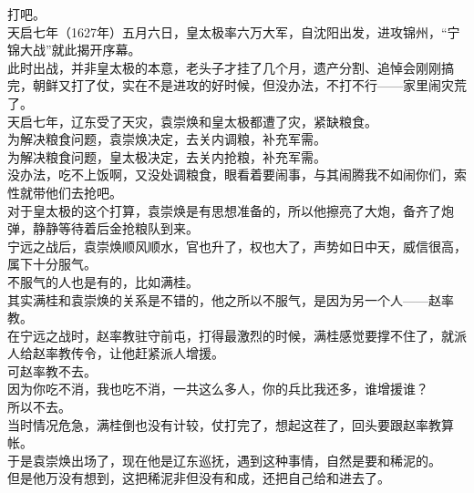 \begin{multicols}{\theparacolNo}
打吧。\\

天启七年（1627年）五月六日，皇太极率六万大军，自沈阳出发，进攻锦州，“宁锦大战”就此揭开序幕。\\

此时出战，并非皇太极的本意，老头子才挂了几个月，遗产分割、追悼会刚刚搞完，朝鲜又打了仗，实在不是进攻的好时候，但没办法，不打不行——家里闹灾荒了。\\

天启七年，辽东受了天灾，袁崇焕和皇太极都遭了灾，紧缺粮食。\\

为解决粮食问题，袁崇焕决定，去关内调粮，补充军需。\\

为解决粮食问题，皇太极决定，去关内抢粮，补充军需。\\

没办法，吃不上饭啊，又没处调粮食，眼看着要闹事，与其闹腾我不如闹你们，索性就带他们去抢吧。\\

对于皇太极的这个打算，袁崇焕是有思想准备的，所以他擦亮了大炮，备齐了炮弹，静静等待着后金抢粮队到来。\\

宁远之战后，袁崇焕顺风顺水，官也升了，权也大了，声势如日中天，威信很高，属下十分服气。\\

不服气的人也是有的，比如满桂。\\

其实满桂和袁崇焕的关系是不错的，他之所以不服气，是因为另一个人——赵率教。\\

在宁远之战时，赵率教驻守前屯，打得最激烈的时候，满桂感觉要撑不住了，就派人给赵率教传令，让他赶紧派人增援。\\

可赵率教不去。\\

因为你吃不消，我也吃不消，一共这么多人，你的兵比我还多，谁增援谁？\\

所以不去。\\

当时情况危急，满桂倒也没有计较，仗打完了，想起这茬了，回头要跟赵率教算帐。\\

于是袁崇焕出场了，现在他是辽东巡抚，遇到这种事情，自然是要和稀泥的。\\

但是他万没有想到，这把稀泥非但没有和成，还把自己给和进去了。\\


\end{multicols}
